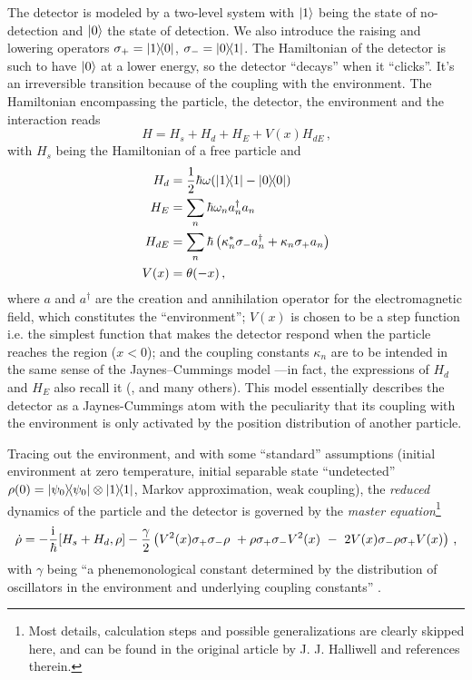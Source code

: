 The detector is modeled by a two-level system with $\ket{1}$ being the state of no-detection
and $\ket{0}$ the state of detection.
We also introduce the raising and lowering operators $\sigma_{+}=\ketbra{1}{0}$, $\sigma_{-}=\ketbra{0}{1}$.
The Hamiltonian of the detector is such to have $\ket{0}$
at a lower energy, so the detector ``decays'' when it ``clicks''. It's an irreversible transition because
of the coupling with the environment.
The Hamiltonian encompassing the particle, the detector, the environment and the interaction reads
\begin{equation}
  H = H_s + H_d + H_{E} + V(x)  H_{dE} \,\text{,}
\end{equation}
with $H_s$ being the Hamiltonian of a free particle and
\begin{subequations}\begin{align}
  H_d     &= \frac{1}{2}\hbar\omega \qty(\ketbra{1} - \ketbra{0}) \\
  H_{E}   &= \sum_n \hbar \omega_n a_n^{\dag} a_n \\
  H_{dE}  &= \sum_n \hbar \left( \kappa^*_n \sigma_{-} a_n^{\dag} + \kappa_n \sigma_{+} a_n \right) \\
  V(x)    &= \theta(-x) \,\text{,}
\end{align}\end{subequations}
where $a$ and $a^{\dagger}$ are the creation and annihilation operator for the electromagnetic field,
which constitutes the ``environment''; $V(x)$ is chosen to be a step function
i.e. the simplest function that makes the detector respond
when the particle reaches the region ($x<0$);
and the coupling constants $\kappa_{n}$ are to be intended in the same sense of the Jaynes--Cummings model
---in fact, the expressions of $H_d$ and $H_E$ also recall it
(\cite[sec.10.2]{WallsMilburn}, \cite{JCM} and many others).
This model essentially describes the detector as a Jaynes-Cummings atom
with the peculiarity that its coupling with the environment
is only activated by the position distribution
of another particle.

Tracing out the environment, and with some ``standard'' assumptions
(initial environment at zero temperature,
initial separable state ``undetected'' $\rho(0) = \ketbra{\psi_0}\otimes\ketbra{1}$,
Markov approximation,
weak coupling),
the \emph{reduced} dynamics of the particle and the detector
is governed by the \emph{master equation}\footnote{
  Most details, calculation steps and possible generalizations are clearly skipped here, and can be found
  in the original article by J. J. Halliwell \parencite{Halliwell_Irreversible}
  and references therein.
}
\begin{equation}
  \dot{\rho} = -\frac{\iu}{\hbar} [ H_s + H_d, \rho] 
- { \gamma \over 2} \left( V^2 (x ) \sigma_{+} \sigma_{-}  \rho \ +  \rho
\sigma_{+} \sigma_{-}   V^2 (x)  \ -  \ 2 V (x) \sigma_{-}  \rho \sigma_{+} V (x )
\right)
\,\text{,}
\end{equation}
with $\gamma$ being ``a phenemonological constant determined by the distribution of oscillators in the
environment and underlying coupling constants'' \parencite{Halliwell_Irreversible}.

